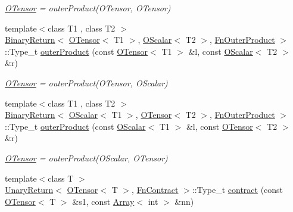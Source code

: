 \begin{DoxyCompactItemize}
\begin{DoxyCompactList}\small\item\em \mbox{\hyperlink{classENSEM_1_1OTensor}{O\+Tensor}} = outer\+Product(\+O\+Tensor, O\+Tensor) \end{DoxyCompactList}\item 
{\footnotesize template$<$class T1 , class T2 $>$ }\\\mbox{\hyperlink{structENSEM_1_1BinaryReturn}{Binary\+Return}}$<$ \mbox{\hyperlink{classENSEM_1_1OTensor}{O\+Tensor}}$<$ T1 $>$, \mbox{\hyperlink{classENSEM_1_1OScalar}{O\+Scalar}}$<$ T2 $>$, \mbox{\hyperlink{structENSEM_1_1FnOuterProduct}{Fn\+Outer\+Product}} $>$\+::Type\+\_\+t \mbox{\hyperlink{group__obstensor_ga2f3f321adaac09837bf726a64c539c11}{outer\+Product}} (const \mbox{\hyperlink{classENSEM_1_1OTensor}{O\+Tensor}}$<$ T1 $>$ \&l, const \mbox{\hyperlink{classENSEM_1_1OScalar}{O\+Scalar}}$<$ T2 $>$ \&r)
\begin{DoxyCompactList}\small\item\em \mbox{\hyperlink{classENSEM_1_1OTensor}{O\+Tensor}} = outer\+Product(\+O\+Tensor, O\+Scalar) \end{DoxyCompactList}\item 
{\footnotesize template$<$class T1 , class T2 $>$ }\\\mbox{\hyperlink{structENSEM_1_1BinaryReturn}{Binary\+Return}}$<$ \mbox{\hyperlink{classENSEM_1_1OScalar}{O\+Scalar}}$<$ T1 $>$, \mbox{\hyperlink{classENSEM_1_1OTensor}{O\+Tensor}}$<$ T2 $>$, \mbox{\hyperlink{structENSEM_1_1FnOuterProduct}{Fn\+Outer\+Product}} $>$\+::Type\+\_\+t \mbox{\hyperlink{group__obstensor_ga4b391fbdb7626ccda42a2068c3ff5ba2}{outer\+Product}} (const \mbox{\hyperlink{classENSEM_1_1OScalar}{O\+Scalar}}$<$ T1 $>$ \&l, const \mbox{\hyperlink{classENSEM_1_1OTensor}{O\+Tensor}}$<$ T2 $>$ \&r)
\begin{DoxyCompactList}\small\item\em \mbox{\hyperlink{classENSEM_1_1OTensor}{O\+Tensor}} = outer\+Product(\+O\+Scalar, O\+Tensor) \end{DoxyCompactList}\item 
{\footnotesize template$<$class T $>$ }\\\mbox{\hyperlink{structENSEM_1_1UnaryReturn}{Unary\+Return}}$<$ \mbox{\hyperlink{classENSEM_1_1OTensor}{O\+Tensor}}$<$ T $>$, \mbox{\hyperlink{structENSEM_1_1FnContract}{Fn\+Contract}} $>$\+::Type\+\_\+t \mbox{\hyperlink{group__obstensor_ga2c9ce6b1bd52f861eb3ec96cee9d6334}{contract}} (const \mbox{\hyperlink{classENSEM_1_1OTensor}{O\+Tensor}}$<$ T $>$ \&s1, const \mbox{\hyperlink{classXMLArray_1_1Array}{Array}}$<$ int $>$ \&nn)

\end{DoxyCompactItemize}
